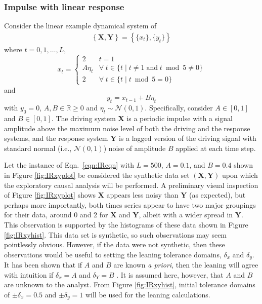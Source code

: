 \documentclass{article}[10pt]
\begin{document}
\subsubsection{Impulse with linear response}
\label{sec:IR}
Consider the linear example dynamical system of
\begin{eqnarray}
\label{eqn:IReqn}
\left\{\mathbf{X},\mathbf{Y}\right\} = \left\{\{x_t\},\{y_t\}\right\}
\end{eqnarray}
where $t=0,1,\ldots,L$,
\begin{equation*}
x_t = \left\{
  \begin{array}{lr}
    2 & t = 1\\
    A\eta_t & \forall\; t\in\{t\;|\;t\neq 1 \;\mathrm{and}\; t\bmod 5 \neq 0\}\\
    2 & \forall\; t\in\{t\;|\;t\bmod 5 = 0\}
  \end{array}
\right.
\end{equation*}
and
\begin{equation*}
y_t = x_{t-1} + B\eta_t
\end{equation*}
with $y_0 = 0$, $A,B\in\mathbb{R}\ge 0$ and $\eta_t\sim\mathcal{N}\left(0,1\right)$.  Specifically, consider $A\in[0,1]$ and $B\in[0,1]$.  The driving system $\mathbf{X}$ is a periodic impulse with a signal amplitude above the maximum noise level of both the driving and the response systems, and the response system $\mathbf{Y}$ is a lagged version of the driving signal with standard normal (i.e.,  $\mathcal{N}\left(0,1\right)$) noise of amplitude $B$ applied at each time step.  

Let the instance of Eqn.\ \ref{eqn:IReqn} with $L=500$, $A=0.1$, and $B=0.4$ shown in Figure \ref{fig:IRxyplot} be considered the synthetic data set $(\mathbf{X},\mathbf{Y})$ upon which the exploratory causal analysis will be performed.  A preliminary visual inspection of Figure \ref{fig:IRxyplot} shows $\mathbf{X}$ appears less noisy than $\mathbf{Y}$ (as expected), but perhaps more importantly, both times series appear to have two major groupings for their data, around 0 and 2 for $\mathbf{X}$ and $\mathbf{Y}$, albeit with a wider spread in $\mathbf{Y}$.  This observation is supported by the histograms of these data shown in Figure \ref{fig:IRxyhist}.  This data set is synthetic, so such observations may seem pointlessly obvious.  However, if the data were not synthetic, then these observations would be useful to setting the leaning tolerance domains, $\delta_x$ and $\delta_y$.  It has been shown that if $A$ and $B$ are known {\em a priori}, then the leaning will agree with intuition if $\delta_x=A$ and $\delta_Y=B$ \cite{Weigel2014}.  It is assumed here, however, that $A$ and $B$ are unknown to the analyst.  From Figure \ref{fig:IRxyhist}, initial tolerance domains of $\pm\delta_x = 0.5$ and $\pm\delta_y=1$ will be used for the leaning calculations.  
\end{document}
